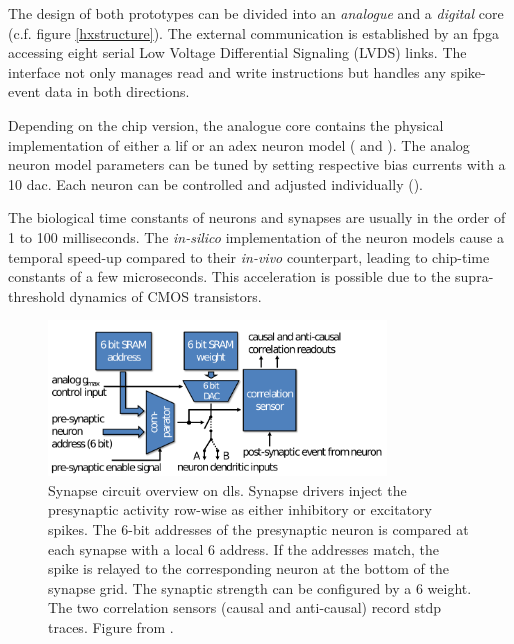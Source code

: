 The design of both prototypes can be divided into an \emph{analogue} and a \emph{digital} core (c.f. figure \ref{hxstructure}). The external communication is established by an \gls{fpga} accessing eight serial Low Voltage Differential Signaling (LVDS) links. The interface not only manages read and write instructions but handles any spike-event data in both directions.

Depending on the chip version, the analogue core contains the physical implementation of either a \gls{lif} or an \gls{adex} neuron model (\citealp{aamir2018dls2neuron} and \citealp{aamir2018mixed}). The analog neuron model parameters can be tuned by setting respective bias currents with a \SI{10}{\bit} \gls{dac}. Each neuron can be controlled and adjusted individually (\citealp{hock13analogmemory}). 

The biological time constants of neurons and synapses are usually in the order of 1 to 100 milliseconds. The \textit{in-silico} implementation of the neuron models cause a temporal speed-up compared to their \textit{in-vivo} counterpart, leading to chip-time constants of a few microseconds. This acceleration is possible due to the supra-threshold dynamics of CMOS transistors. 

\begin{figure}
	\centering
	\includegraphics[width=0.8\textwidth]{figures/synapse.png}
	\caption[Synapse circuit overview on \gls{dls}]{Synapse circuit overview on \gls{dls}. Synapse drivers inject the presynaptic activity row-wise as either inhibitory or excitatory spikes. The 6-bit addresses of the presynaptic neuron is compared at each synapse with a local \SI{6}{\bit} address. If the addresses match, the spike is relayed to the corresponding neuron at the bottom of the synapse grid. The synaptic strength can be configured by a \SI{6}{\bit} weight. The two correlation sensors (causal and anti-causal) record \gls{stdp} traces. Figure from \citealp{friedmann2016hybridlearning}.}
	\label{synapseschematics}
\end{figure}

